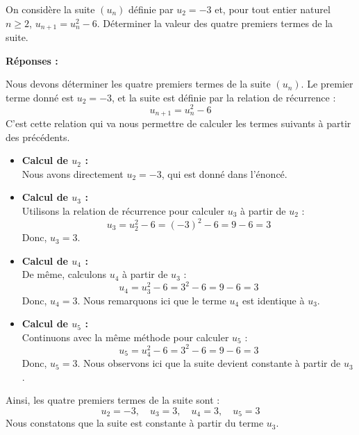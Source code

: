 \documentclass[a4paper,12pt]{article}
\begin{document}
\begin{tcolorbox}[colback=gray!10, colframe=gray!50, title=Exercice \textbf{66}]
  On considère la suite $(u_n)$ définie par $u_2 = -3$ et, pour tout entier naturel $n \geq 2$, $u_{n+1} = u_n^2 - 6$. Déterminer la valeur des quatre premiers termes de la suite.
  \end{tcolorbox}

  \textbf{Réponses :}

  Nous devons déterminer les quatre premiers termes de la suite $(u_n)$. Le premier terme donné est $u_2 = -3$, et la suite est définie par la relation de récurrence : 
  \[
  u_{n+1} = u_n^2 - 6
  \]
  C'est cette relation qui va nous permettre de calculer les termes suivants à partir des précédents.
  
  \begin{itemize}
      \item \textbf{Calcul de $u_2$ :} \\
      Nous avons directement $u_2 = -3$, qui est donné dans l'énoncé.
  
      \item \textbf{Calcul de $u_3$ :} \\
      Utilisons la relation de récurrence pour calculer $u_3$ à partir de $u_2$ :
      \[
      u_3 = u_2^2 - 6 = (-3)^2 - 6 = 9 - 6 = 3
      \]
      Donc, $u_3 = 3$.
  
      \item \textbf{Calcul de $u_4$ :} \\
      De même, calculons $u_4$ à partir de $u_3$ :
      \[
      u_4 = u_3^2 - 6 = 3^2 - 6 = 9 - 6 = 3
      \]
      Donc, $u_4 = 3$. Nous remarquons ici que le terme $u_4$ est identique à $u_3$.
  
      \item \textbf{Calcul de $u_5$ :} \\
      Continuons avec la même méthode pour calculer $u_5$ :
      \[
      u_5 = u_4^2 - 6 = 3^2 - 6 = 9 - 6 = 3
      \]
      Donc, $u_5 = 3$. Nous observons ici que la suite devient constante à partir de $u_3$.
  \end{itemize}
  
  Ainsi, les quatre premiers termes de la suite sont : 
  \[
  u_2 = -3, \quad u_3 = 3, \quad u_4 = 3, \quad u_5 = 3
  \]
  Nous constatons que la suite est constante à partir du terme $u_3$.
\end{document}
